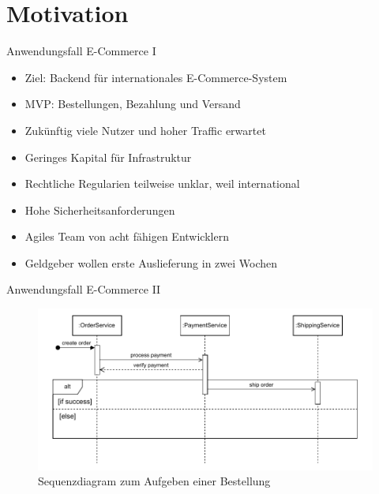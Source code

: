 \section*{Motivation}

\begin{frame}{Anwendungsfall E-Commerce I}
    \begin{itemize}
        \item Ziel: Backend für internationales E-Commerce-System
        \item MVP: Bestellungen, Bezahlung und Versand
        \item Zukünftig viele Nutzer und hoher Traffic erwartet
        \item Geringes Kapital für Infrastruktur
        \item Rechtliche Regularien teilweise unklar, weil international
        \item Hohe Sicherheitsanforderungen
        \item Agiles Team von acht fähigen Entwicklern
        \item Geldgeber wollen erste Auslieferung in zwei Wochen
    \end{itemize}
\end{frame}

\begin{frame}{Anwendungsfall E-Commerce II}
    \begin{figure}[!h]
        \centering
        \includegraphics[scale=0.65]{imglib/einleitung/ecommerce.drawio}
        \caption{Sequenzdiagram zum Aufgeben einer Bestellung}
        \label{fig:ecommerce}
    \end{figure}
\end{frame}
